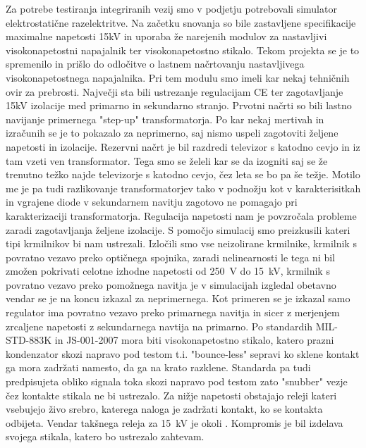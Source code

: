 \documentclass[a4paper,twoside,openright,12pt,slovene]{book}
\begin{document}
Za potrebe testiranja integriranih vezij smo v podjetju potrebovali simulator elektrostatične razelektritve. Na začetku snovanja so bile zastavljene specifikacije maximalne napetosti 15kV in uporaba že narejenih modulov za nastavljivi visokonapetostni napajalnik ter visokonapetostno stikalo. Tekom projekta se je to spremenilo in prišlo do odločitve o lastnem načrtovanju nastavljivega visokonapetostnega napajalnika. Pri tem modulu smo imeli kar nekaj tehničnih ovir za prebrosti. Največji sta bili ustrezanje regulacijam CE ter zagotavljanje 15kV izolacije med primarno in sekundarno stranjo.
Prvotni načrti so bili lastno navijanje primernega "step-up" transformatorja. Po kar nekaj mertivah in izračunih se je to pokazalo za neprimerno, saj nismo uspeli zagotoviti željene napetosti in izolacije. Rezervni načrt je bil razdredi televizor s katodno cevjo in iz tam vzeti ven transformator. Tega smo se želeli kar se da izogniti saj se že trenutno težko najde televizorje s katodno cevjo, čez leta se bo pa še težje. Motilo me je pa tudi razlikovanje transformatorjev tako v podnožju kot v karakterisitkah in vgrajene diode v sekundarnem navitju zagotovo ne pomagajo pri karakterizaciji transformatorja. 
Regulacija napetosti nam je povzročala probleme zaradi zagotavljanja željene izolacije. S pomočjo simulacij smo preizkusili kateri tipi krmilnikov bi nam ustrezali. Izločili smo vse neizolirane krmilnike, krmilnik s povratno vezavo preko optičnega spojnika, zaradi nelinearnosti le tega ni bil zmožen pokrivati celotne izhodne napetosti od \SI{250}{\volt} do \SI{15}{\kilo\volt}, krmilnik s povratno vezavo preko pomožnega navitja je v simulacijah izgledal obetavno vendar se je na koncu izkazal za neprimernega. Kot primeren se je izkazal samo regulator ima povratno vezavo preko primarnega navitja in sicer z merjenjem zrcaljene napetosti z sekundarnega navtija na primarno.
Po standardih MIL-STD-883K in JS-001-2007 mora biti visokonapetostno stikalo, katero prazni kondenzator skozi napravo pod testom t.i. "bounce-less" sepravi ko sklene kontakt ga mora zadržati namesto, da ga na krato razklene. Standarda pa tudi predpisujeta obliko signala toka skozi napravo pod testom zato "snubber" vezje čez kontakte stikala ne bi ustrezalo. Za nižje napetosti obstajajo releji kateri vsebujejo živo srebro, katerega naloga je zadržati kontakt, ko se kontakta odbijeta. Vendar takšnega releja za \SI{15}{\kilo\volt} je okoli .
Kompromis je bil izdelava svojega stikala, katero bo ustrezalo zahtevam.
\end{document}

